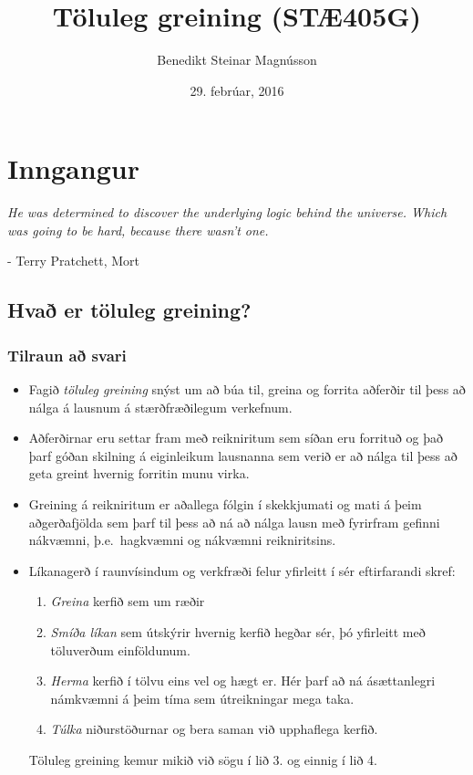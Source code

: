 \documentclass[letterpaper,10pt,icelandic]{sphinxmanual}
\title{Töluleg greining (STÆ405G)}
\date{29. febrúar, 2016}
\author{Benedikt Steinar Magnússon}
\begin{document}
\maketitle
\tableofcontents
{}\label{index::doc}


\chapter{Inngangur}
\label{kafli01::doc}\label{kafli01:inngangur}
\emph{He was determined to discover the underlying logic behind the universe. Which was going to be hard, because there wasn't one.}

- Terry Pratchett, Mort


\section{Hvað er töluleg greining?}
\label{kafli01:hva-er-toluleg-greining}

\subsection{Tilraun að svari}
\label{kafli01:tilraun-a-svari}\begin{itemize}
\item {} 
Fagið \emph{töluleg greining} snýst um að búa til, greina og forrita
aðferðir til þess að nálga á lausnum á stærðfræðilegum verkefnum.

\item {} 
Aðferðirnar eru settar fram með reikniritum sem síðan eru forrituð og
það þarf góðan skilning á eiginleikum lausnanna sem verið er að nálga
til þess að geta greint hvernig forritin munu virka.

\item {} 
Greining á reikniritum er aðallega fólgin í skekkjumati og mati á
þeim aðgerðafjölda sem þarf til þess að ná að nálga lausn með
fyrirfram gefinni nákvæmni, þ.e. hagkvæmni og nákvæmni reikniritsins.

\item {} 
Líkanagerð í raunvísindum og verkfræði felur yfirleitt í sér eftirfarandi skref:
\begin{enumerate}
\item {} 
\emph{Greina} kerfið sem um ræðir

\item {} 
\emph{Smíða líkan} sem útskýrir hvernig kerfið hegðar sér, þó yfirleitt með töluverðum einföldunum.

\item {} 
\emph{Herma} kerfið í tölvu eins vel og hægt er. Hér þarf að ná ásættanlegri námkvæmni á þeim tíma sem útreikningar mega taka.

\item {} 
\emph{Túlka} niðurstöðurnar og bera saman við upphaflega kerfið.

\end{enumerate}

Töluleg greining kemur mikið við sögu í lið 3. og einnig í lið 4.

\end{itemize}
\end{document}
